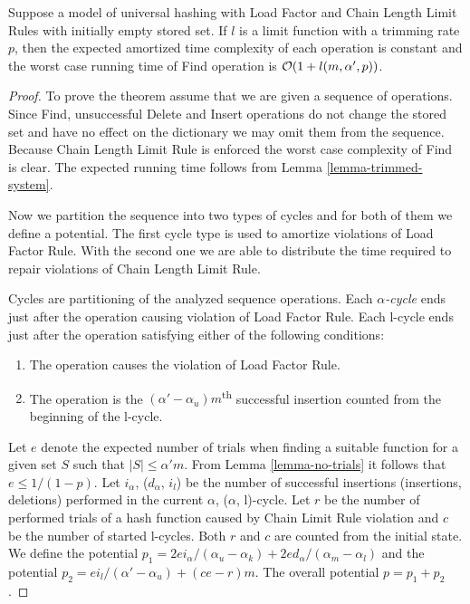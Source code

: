 \begin{theorem}
\label{theorem-amortised-expected-time}
Suppose a model of universal hashing with Load Factor and Chain Length Limit Rules with initially empty stored set. If $l$ is a limit function with a trimming rate $p$, then the expected amortized time complexity of each operation is constant and the worst case running time of Find operation is $\mathcal{O}(1 + l(m, \alpha', p))$.
\end{theorem}
\begin{proof}
To prove the theorem assume that we are given a sequence of operations. Since Find, unsuccessful Delete and Insert operations do not change the stored set and have no effect on the dictionary we may omit them from the sequence. Because Chain Length Limit Rule is enforced the worst case complexity of Find is clear. The expected running time follows from Lemma \ref{lemma-trimmed-system}.

Now we partition the sequence into two types of cycles and for both of them we define a potential. The first cycle type is used to amortize violations of Load Factor Rule. With the second one we are able to distribute the time required to repair violations of Chain Length Limit Rule.

\begin{definition}
Cycles are partitioning of the analyzed sequence operations.
Each \emph{$\alpha$-cycle} ends just after the operation causing violation of Load Factor Rule.
Each l-cycle ends just after the operation satisfying either of the following conditions:
\begin{enumerate}
\item The operation causes the violation of Load Factor Rule.
\item The operation is the $(\alpha' - \alpha_u) m$\textsuperscript{th} successful insertion counted from the beginning of the l-cycle.
\end{enumerate}
\end{definition}

Let $e$ denote the expected number of trials when finding a suitable function for a given set $S$ such that $|S| \leq \alpha'm$. From Lemma \ref{lemma-no-trials} it follows that $e \leq 1 / (1 - p)$. Let $i_{\alpha}$, ($d_\alpha$, $i_l$) be the number of successful insertions (insertions, deletions) performed in the current $\alpha$, ($\alpha$, l)-cycle. Let $r$ be the number of performed trials of a hash function caused by Chain Limit Rule violation and $c$ be the number of started l-cycles. Both $r$ and $c$ are counted from the initial state. We define the potential $p_1 = {2ei_{\alpha}}/{(\alpha_u - \alpha_k)} + {2ed_{\alpha}}/{(\alpha_m - \alpha_l)}$ and the potential $p_2 = {ei_{l}}/{(\alpha' - \alpha_u)} + (ce - r) m$.  The overall potential $p = p_1 + p_2$.


\end{proof}
